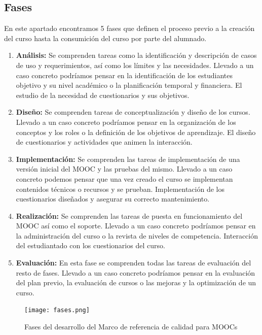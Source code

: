 \subsection{Fases}
En este apartado encontramos 5 fases que definen el proceso previo a la creación del curso hasta la consumición del curso por parte del alumnado.
\begin{enumerate}
    \item \textbf{Análisis:} Se comprenden tareas como la identificación y descripción de casos de uso y requerimientos, así como los límites y las necesidades. Llevado a un caso concreto podríamos pensar en la identificación de los estudiantes objetivo y su nivel académico o la planificación temporal y financiera. El estudio de la necesidad de cuestionarios y sus objetivos.
    
    \item \textbf{Diseño:} Se comprenden tareas de conceptualización y diseño de los cursos. Llevado a un caso concreto podríamos pensar en la organización de los conceptos y los roles o la definición de los objetivos de aprendizaje. El diseño de cuestionarios y actividades que animen la interacción.
    
    \item \textbf{Implementación:} Se comprenden las tareas de implementación de una versión inicial del MOOC y las pruebas del mismo. Llevado a un caso concreto podemos pensar que una vez creado el curso se implementan contenidos técnicos o recursos y se prueban. Implementación de los cuestionarios diseñados y asegurar su correcto mantenimiento.
    
    \item \textbf{Realización:} Se comprenden las tareas de puesta en funcionamiento del MOOC así como el soporte. Llevado a un caso concreto podríamos pensar en la administración del curso o la revista de niveles de competencia. Interacción del estudiantado con los cuestionarios del curso.
    
    \item \textbf{Evaluación:} En esta fase se comprenden todas las tareas de evaluación del resto de fases. Llevado a un caso concreto podríamos pensar en la evaluación del plan previo, la evaluación  de cursos o las mejoras y la optimización de un curso.
    
\end{enumerate}

\begin{figure}[H]
    \centering
    \texttt{[image: fases.png]}
    \caption{Fases del desarrollo del Marco de referencia de calidad para MOOCs}
    \label{fig:fases-calidad}
\end{figure}


